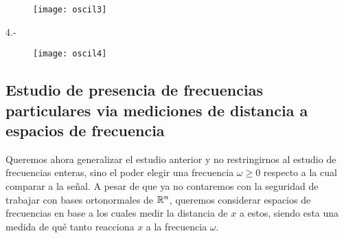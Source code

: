 \begin{figure}[H]
\texttt{[image: oscil3]}
\end{figure}

4.- 
\begin{figure}[H]
\texttt{[image: oscil4]}
\end{figure}



\subsection{Estudio de presencia de frecuencias particulares via mediciones de distancia a espacios de frecuencia}

Queremos ahora generalizar el estudio anterior y no restringirnos
al estudio de frecuencias enteras, 
sino el poder elegir una frecuencia $\omega \geq 0$ respecto
a la cual comparar a la señal. A pesar
de que ya no contaremos con la seguridad de trabajar con bases
ortonormales de $\mathbb{R}^{n}$, queremos considerar espacios de frecuencias
en base a los cuales medir la distancia de $x$ a estos, siendo
esta una medida de qué tanto reacciona $x$ a la frecuencia $\omega$.


